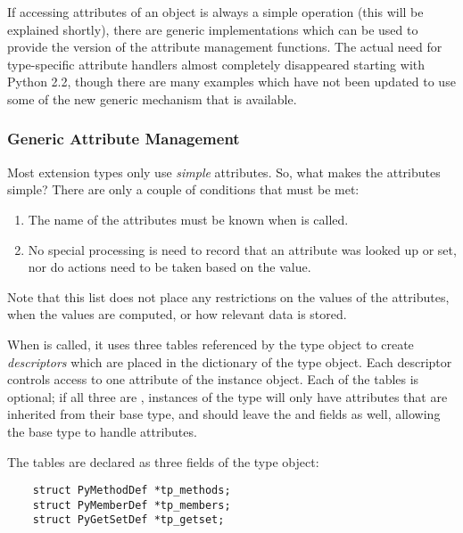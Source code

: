 If accessing attributes of an object is always a simple operation
(this will be explained shortly), there are generic implementations
which can be used to provide the  version of the
attribute management functions.  The actual need for type-specific
attribute handlers almost completely disappeared starting with Python
2.2, though there are many examples which have not been updated to use
some of the new generic mechanism that is available.


\subsubsection{Generic Attribute Management}


Most extension types only use \emph{simple} attributes.  So, what
makes the attributes simple?  There are only a couple of conditions
that must be met:

\begin{enumerate}
  \item   The name of the attributes must be known when
           is called.

  \item   No special processing is need to record that an attribute
          was looked up or set, nor do actions need to be taken based
          on the value.
\end{enumerate}

Note that this list does not place any restrictions on the values of
the attributes, when the values are computed, or how relevant data is
stored.

When  is called, it uses three tables
referenced by the type object to create \emph{descriptors} which are
placed in the dictionary of the type object.  Each descriptor controls
access to one attribute of the instance object.  Each of the tables is
optional; if all three are \NULL, instances of the type will only have
attributes that are inherited from their base type, and should leave
the  and  fields \NULL{} as
well, allowing the base type to handle attributes.

The tables are declared as three fields of the type object:

\begin{verbatim}
    struct PyMethodDef *tp_methods;
    struct PyMemberDef *tp_members;
    struct PyGetSetDef *tp_getset;
\end{verbatim}


